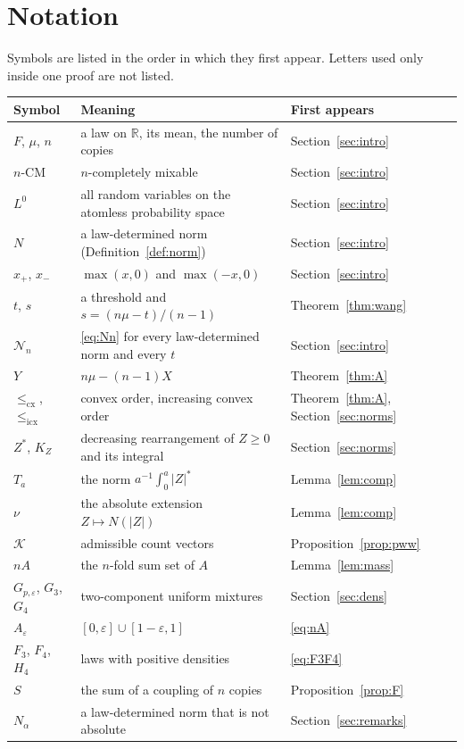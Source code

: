 \documentclass[11pt]{amsart}
\theoremstyle{definition}
\newcommand{\R}{\mathbb{R}}
\newcommand{\cx}{\le_{\mathrm{cx}}}
\newcommand{\icx}{\le_{\mathrm{icx}}}
\newcommand{\cN}{\mathcal{N}}
\begin{document}
\appendix
\section{Notation}\label{app:notation}
Symbols are listed in the order in which they first appear. Letters used only inside one proof are not listed.

\medskip
\begin{center}
\small
\begin{tabular}{@{}lp{}l@{}}
\toprule
Symbol & Meaning & First appears\\
\midrule
$F$, $\mu$, $n$ & a law on $\R$, its mean, the number of copies & Section~\ref{sec:intro}\\
$n$-CM & $n$-completely mixable & Section~\ref{sec:intro}\\
$L^0$ & all random variables on the atomless probability space & Section~\ref{sec:intro}\\
$N$ & a law-determined norm (Definition~\ref{def:norm}) & Section~\ref{sec:intro}\\
$x_+$, $x_-$ & $\max(x,0)$ and $\max(-x,0)$ & Section~\ref{sec:intro}\\
$t$, $s$ & a threshold and $s=(n\mu-t)/(n-1)$ & Theorem~\ref{thm:wang}\\
$\cN_n$ & \eqref{eq:Nn} for every law-determined norm and every $t$ & Section~\ref{sec:intro}\\
$Y$ & $n\mu-(n-1)X$ & Theorem~\ref{thm:A}\\
$\cx$, $\icx$ & convex order, increasing convex order & Theorem~\ref{thm:A}, Section~\ref{sec:norms}\\
$Z^*$, $K_Z$ & decreasing rearrangement of $Z\ge0$ and its integral & Section~\ref{sec:norms}\\
$T_a$ & the norm $a^{-1}\int_0^a|Z|^*$ & Lemma~\ref{lem:comp}\\
$\nu$ & the absolute extension $Z\mapsto N(|Z|)$ & Lemma~\ref{lem:comp}\\
$\mathcal K$ & admissible count vectors & Proposition~\ref{prop:pww}\\
$nA$ & the $n$-fold sum set of $A$ & Lemma~\ref{lem:mass}\\
$G_{p,\varepsilon}$, $G_3$, $G_4$ & two-component uniform mixtures & Section~\ref{sec:dens}\\
$A_\varepsilon$ & $[0,\varepsilon]\cup[1-\varepsilon,1]$ & \eqref{eq:nA}\\
$F_3$, $F_4$, $H_4$ & laws with positive densities & \eqref{eq:F3F4}\\
$S$ & the sum of a coupling of $n$ copies & Proposition~\ref{prop:F}\\
$N_\alpha$ & a law-determined norm that is not absolute & Section~\ref{sec:remarks}\\
\bottomrule
\end{tabular}
\end{center}
\end{document}
